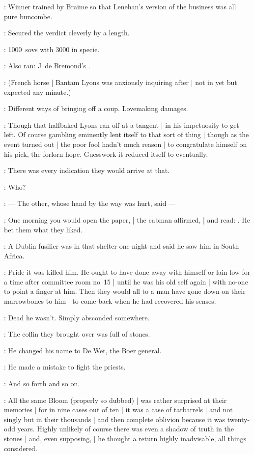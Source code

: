 :
Winner trained by Braime
so that Lenehan's version of the business was all pure buncombe.

:
Secured the verdict cleverly by a length.

:
1000~sovs with 3000 in specie.

:
Also ran: J~de Bremond's .

:
(French horse |
Bantam Lyons was anxiously inquiring after |
not in yet but expected any minute.)

:
Different ways of bringing off a coup.
Lovemaking damages.

:
Though that halfbaked Lyons ran off at a tangent |
in his impetuosity to get left.
Of course gambling eminently lent itself to that sort of thing |
though as the event turned out |
the poor fool hadn't much reason |
to congratulate himself on his pick, the forlorn hope.
Guesswork it reduced itself to eventually.

\Bloom:
There was every indication they would arrive at that.

\Stephen:
Who?

:
    --- The other, whose hand by the way was hurt, said ---

:
One morning you would open the paper, |
the cabman affirmed, |
and read: .
He bet them what they liked.

:
A Dublin fusilier was in that shelter one night and said he saw him in South Africa.

:
Pride it was killed him.
He ought to have done away with himself or lain low for a time after committee room no~15 |
until he was his old self again |
with no-one to point a finger at him.
Then they would all to a man have gone down on their marrowbones to him |
to come back when he had recovered his senses.

:
Dead he wasn't.
Simply absconded somewhere.

:
The coffin they brought over was full of stones.

:
He changed his name to De Wet, the Boer general.

:
He made a mistake to fight the priests.

:
And so forth and so on.

:
All the same Bloom (properly so dubbed) |
was rather surprised at their memories |
for in nine cases out of ten |
it was a case of tarbarrels |
and not singly but in their thousands |
and then complete oblivion because it was twenty-odd years.
Highly unlikely of course there was even a shadow of truth in the stones |
and, even supposing, |
he thought a return highly inadvisable, all things considered.


